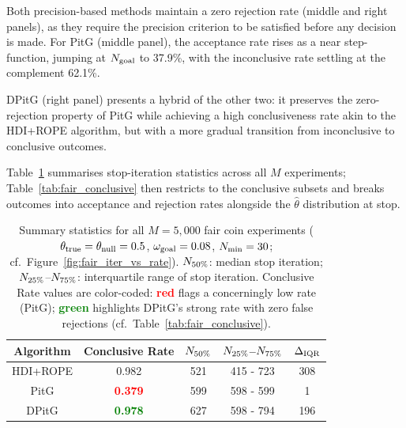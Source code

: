 Both precision-based methods maintain a zero rejection rate (middle and right panels),
as they require the precision criterion to be satisfied before any decision is made.
For PitG (middle panel), the acceptance rate rises as a near step-function, jumping at
$N_{\rm goal}$ to 37.9\%, with the inconclusive rate settling at the complement 62.1\%.

DPitG (right panel) presents a hybrid of the other two: it preserves the zero-rejection
property of PitG while achieving a high conclusiveness rate akin to the HDI+ROPE algorithm, but with
a more gradual transition from inconclusive to conclusive outcomes.

Table~\ref{tab:fair_overall} summarises stop-iteration statistics across all $M$ experiments;
Table~\ref{tab:fair_conclusive} then restricts to the conclusive subsets and breaks outcomes
into acceptance and rejection rates alongside the $\hat{\theta}$ distribution at stop.

\begin{table}[h!]
  \begin{center}
  \begin{tabular}{c|c|c|c|c}
    \hline
    Algorithm &  Conclusive Rate  & $N_{\rm 50\%}$ & $N_{\rm 25\%}$--$N_{\rm 75\%}$ & $\Delta_{\rm IQR}$\\
    \hline
    HDI+ROPE & 0.982 & 521 & 415 - 723& 308  \\
    PitG     & \textcolor{red}{\textbf{0.379}}  & 599 & 598 - 599& 1 \\
    DPitG    & \textcolor{green}{\textbf{0.978}}  & 627 & 598 - 794& 196 \\
    \hline
  \end{tabular}
  \caption{Summary statistics for all $M=5{,}000$ fair coin experiments
  ($\theta_{\rm true}=\theta_{\rm null}=0.5$, $\omega_{\rm goal}=0.08$, $N_{\rm min}=30$;
  cf.\ Figure~\ref{fig:fair_iter_vs_rate}).
  $N_{\rm 50\%}$: median stop iteration;
  $N_{\rm 25\%}$--$N_{\rm 75\%}$: interquartile range of stop iteration.
  Conclusive Rate values are color-coded: \textcolor{red}{\textbf{red}} flags a
  concerningly low rate (PitG); \textcolor{green}{\textbf{green}} highlights DPitG's
  strong rate with zero false rejections (cf.\ Table~\ref{tab:fair_conclusive}).}
  \label{tab:fair_overall}
\end{center}
\end{table}

